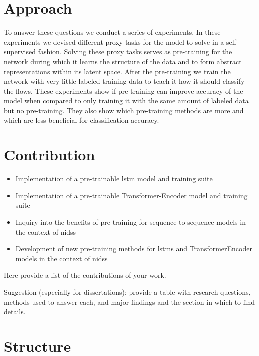 \section{Approach} \label{sect.approach}

To answer these questions we conduct a series of experiments. In these experiments we devised different proxy tasks for the model to solve in a self-supervised fashion. Solving these proxy tasks serves as pre-training for the network during which it learns the structure of the data and to form abstract representations within its latent space. After the pre-training we train the network with very little labeled training data to teach it how it should classify the flows. These experiments show if pre-training can improve accuracy of the model when compared to only training it with the same amount of labeled data but no pre-training. They also show which pre-training methods are more and which are less beneficial for classification accuracy.

\section{Contribution} \label{sect.contribution}

\begin{itemize}
	\item Implementation of a pre-trainable \gls{lstm} model and training suite
	\item Implementation of a pre-trainable Transformer-Encoder model and training suite
	\item Inquiry into the benefits of pre-training for sequence-to-sequence models in the context of \glspl{nids}
	\item Development of new pre-training methods for \glspl{lstm} and TransformerEncoder models in the context of \glspl{nids}
\end{itemize}

Here provide a list of the contributions of your work.

Suggestion (especially for dissertations): provide a table with research questions, methods used to answer each, and major findings and the section in which to find details.

\section{Structure} \label{sect.structure}

